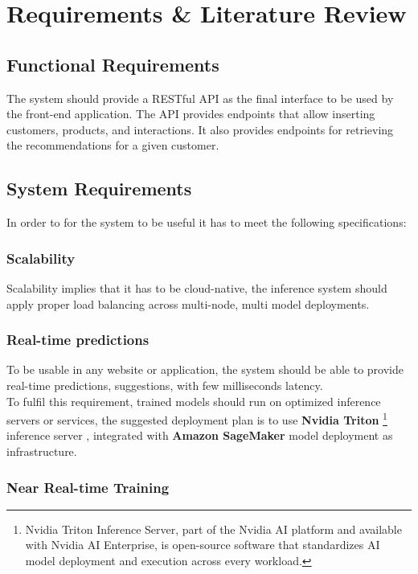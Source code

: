 \chapter{Requirements \& Literature Review}
\minitoc

\section{Functional Requirements}

The system should provide a RESTful API as the final interface to be used by the front-end application.
The API provides endpoints that allow inserting customers, products, and interactions. It also provides endpoints for retrieving the recommendations for a given customer.

\section{System Requirements}

In order to for the system to be useful it has to meet the following specifications:

\subsection{Scalability}
Scalability implies that it has to be cloud-native, the inference system should apply proper load balancing across multi-node, multi model deployments.

\subsection{Real-time predictions}
To be usable in any website or application, the system should be able to provide real-time predictions, suggestions, with few milliseconds latency. \\

To fulfil this requirement, trained models should run on optimized inference servers or services, the suggested deployment plan is to use
\textbf{Nvidia Triton}
\footnote{Nvidia Triton Inference Server, part of the Nvidia AI platform and available with Nvidia AI Enterprise, is open-source software that standardizes AI model deployment and execution across every workload.}
inference server \cite{Triton}, 
integrated with \textbf{Amazon SageMaker} model deployment\cite{SageMaker} as infrastructure.

\subsection{Near Real-time Training}

